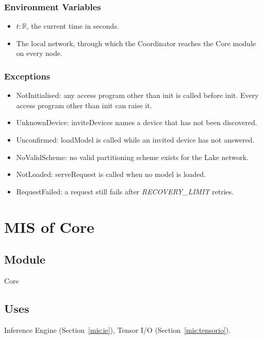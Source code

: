 \documentclass[12pt, titlepage]{article}
\begin{document}
\subsubsection{Environment Variables}

\begin{itemize}
  \item $t: \mathbb{R}$, the current time in seconds.
  \item The local network, through which the Coordinator reaches the Core
    module on every node.
\end{itemize}

\subsubsection{Exceptions}

\begin{itemize}
  \item NotInitialised: any access program other than init is called before
    init. Every access program other than init can raise it.
  \item UnknownDevice: inviteDevices names a device that has not been discovered.
  \item Unconfirmed: loadModel is called while an invited device has not answered.
  \item NoValidScheme: no valid partitioning scheme exists for the Lake network.
  \item NotLoaded: serveRequest is called when no model is loaded.
  \item RequestFailed: a request still fails after \textit{RECOVERY\_LIMIT}
    retries.
\end{itemize}

\newpage

\section{MIS of Core} \label{mis:core}

\subsection{Module}

Core

\subsection{Uses}

Inference Engine (Section~\ref{mis:ie}), Tensor I/O (Section~\ref{mis:tensorio}).
\end{document}
